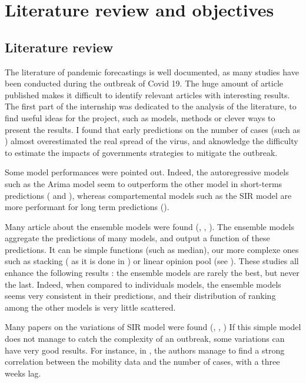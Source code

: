 \section{Literature review and objectives}

\subsection{Literature review}

The literature of pandemic forecastings is well documented, as many studies have been conducted during the outbreak of Covid 19. 
The huge amount of article published makes it difficult to identify relevant articles with interesting results. 
The first part of the internship was dedicated to the analysis of the literature, to find useful ideas for the project, such as models, methods or clever ways to present the results. 
I found that early predictions on the number of cases (such as \cite{gardner2020intervention}) almost overestimated the real spread of the virus, and aknowledge the difficulty to estimate the impacts of governments strategies to mitigate the outbreak. 

Some model performances were pointed out. 
Indeed, the autoregressive models such as the Arima model seem to outperform the other model in short-terms predictions (\cite{kufel2020arima} and \cite{shang2021regional}), whereas compartemental models such as the SIR model are more performant for long term predictions (\cite{rahmandad2022enhancing}).

Many article about the ensemble models were found (\cite{cramer2022evaluation}, \cite{reich2019accuracy}, \cite{howerton2023evaluation}). 
The ensemble models aggregate the predictions of many models, and output a function of these predictions. 
It can be simple functions (such as median), our more complexe ones such as stacking ( as it is done in \cite{reich2019accuracy} ) or linear opinion pool (see \cite{howerton2023evaluation}).
These studies all enhance the following results : the ensemble models are rarely the best, but never the last. 
Indeed, when compared to individuals models, the ensemble models seems very consistent in their predictions, and their distribution of ranking among the other models is very little scattered. 

Many papers on the variations of SIR model were found (\cite{gerlee2021predicting}, \cite{hult2020estimates}, \cite{sjodin2020covid})
If this simple model does not manage to catch the complexity of an outbreak, some variations can have very good results. 
For instance, in \cite{gerlee2021predicting}, the authors manage to find a strong correlation between the mobility data and the number of cases, with a three weeks lag. 

